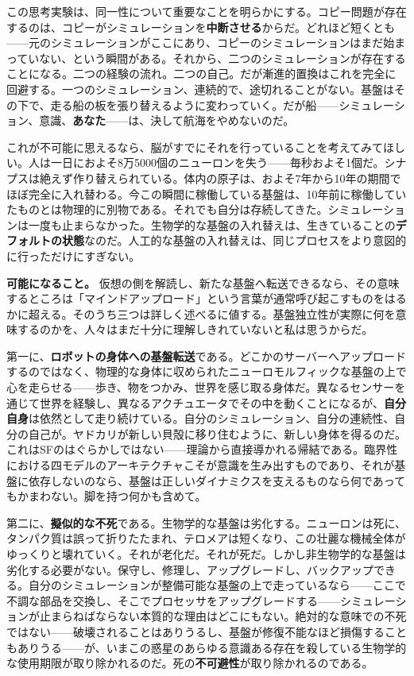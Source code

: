 \documentclass[11pt, twoside, openright]{book}
\begin{document}
この思考実験は、同一性について重要なことを明らかにする。コピー問題が存在するのは、コピーがシミュレーションを\textbf{中断させる}からだ。どれほど短くとも------元のシミュレーションがここにあり、コピーのシミュレーションはまだ始まっていない、という瞬間がある。それから、二つのシミュレーションが存在することになる。二つの経験の流れ。二つの自己。だが漸進的置換はこれを完全に回避する。一つのシミュレーション、連続的で、途切れることがない。基盤はその下で、走る船の板を張り替えるように変わっていく。だが船------シミュレーション、意識、\textbf{あなた}------は、決して航海をやめないのだ。

これが不可能に思えるなら、脳がすでにそれを行っていることを考えてみてほしい。人は一日におよそ8万5000個のニューロンを失う------毎秒およそ1個だ。シナプスは絶えず作り替えられている。体内の原子は、およそ7年から10年の期間でほぼ完全に入れ替わる。今この瞬間に稼働している基盤は、10年前に稼働していたものとは物理的に別物である。それでも自分は存続してきた。シミュレーションは一度も止まらなかった。生物学的な基盤の入れ替えは、生きていることの\textbf{デフォルトの状態}なのだ。人工的な基盤の入れ替えは、同じプロセスをより意図的に行っただけにすぎない。

\textbf{可能になること。} 仮想の側を解読し、新たな基盤へ転送できるなら、その意味するところは「マインドアップロード」という言葉が通常呼び起こすものをはるかに超える。そのうち三つは詳しく述べるに値する。基盤独立性が実際に何を意味するのかを、人々はまだ十分に理解しきれていないと私は思うからだ。

第一に、\textbf{ロボットの身体への基盤転送}である。どこかのサーバーへアップロードするのではなく、物理的な身体に収められたニューロモルフィックな基盤の上で心を走らせる------歩き、物をつかみ、世界を感じ取る身体だ。異なるセンサーを通じて世界を経験し、異なるアクチュエータでその中を動くことになるが、\textbf{自分自身}は依然として走り続けている。自分のシミュレーション、自分の連続性、自分の自己が。ヤドカリが新しい貝殻に移り住むように、新しい身体を得るのだ。これはSFのはぐらかしではない------理論から直接導かれる帰結である。臨界性における四モデルのアーキテクチャこそが意識を生み出すものであり、それが基盤に依存しないのなら、基盤は正しいダイナミクスを支えるものなら何であってもかまわない。脚を持つ何かも含めて。

第二に、\textbf{擬似的な不死}である。生物学的な基盤は劣化する。ニューロンは死に、タンパク質は誤って折りたたまれ、テロメアは短くなり、この壮麗な機械全体がゆっくりと壊れていく。それが老化だ。それが死だ。しかし非生物学的な基盤は劣化する必要がない。保守し、修理し、アップグレードし、バックアップできる。自分のシミュレーションが整備可能な基盤の上で走っているなら------ここで不調な部品を交換し、そこでプロセッサをアップグレードする------シミュレーションが止まらねばならない本質的な理由はどこにもない。絶対的な意味での不死ではない------破壊されることはありうるし、基盤が修復不能なほど損傷することもありうる------が、いまこの惑星のあらゆる意識ある存在を殺している生物学的な使用期限が取り除かれるのだ。死の\textbf{不可避性}が取り除かれるのである。
\end{document}
